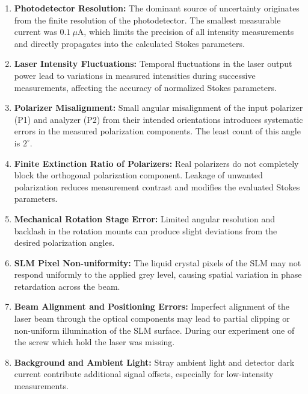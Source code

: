 \begin{enumerate}

\item \textbf{Photodetector Resolution:}  
The dominant source of uncertainty originates from the finite resolution of the photodetector. The smallest measurable current was $0.1~\mu$A, which limits the precision of all intensity measurements and directly propagates into the calculated Stokes parameters.

\item \textbf{Laser Intensity Fluctuations:}  
Temporal fluctuations in the laser output power lead to variations in measured intensities during successive measurements, affecting the accuracy of normalized Stokes parameters.

\item \textbf{Polarizer Misalignment:}  
Small angular misalignment of the input polarizer (P1) and analyzer (P2) from their intended orientations introduces systematic errors in the measured polarization components. The least count of this angle is $2^{\circ}$.

\item \textbf{Finite Extinction Ratio of Polarizers:}  
Real polarizers do not completely block the orthogonal polarization component. Leakage of unwanted polarization reduces measurement contrast and modifies the evaluated Stokes parameters.

\item \textbf{Mechanical Rotation Stage Error:}  
Limited angular resolution and backlash in the rotation mounts can produce slight deviations from the desired polarization angles.

\item \textbf{SLM Pixel Non-uniformity:}  
The liquid crystal pixels of the SLM may not respond uniformly to the applied grey level, causing spatial variation in phase retardation across the beam.

\item \textbf{Beam Alignment and Positioning Errors:}  
Imperfect alignment of the laser beam through the optical components may lead to partial clipping or non-uniform illumination of the SLM surface. During our experiment one of the screw which hold the laser was missing.

\item \textbf{Background and Ambient Light:}  
Stray ambient light and detector dark current contribute additional signal offsets, especially for low-intensity measurements.

\end{enumerate}

